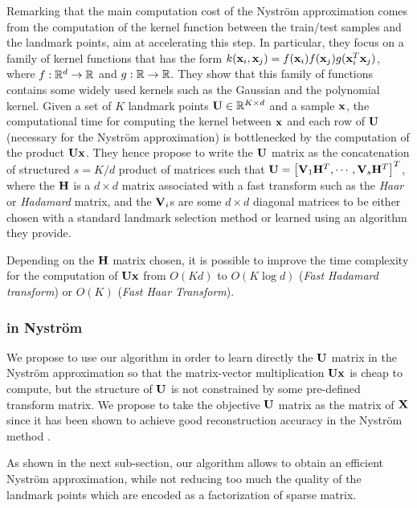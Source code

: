 Remarking that the main computation cost of the Nyström approximation comes from the computation of the kernel function between the train/test samples and the landmark points, \cite{si2016computationally} aim at accelerating this step. In particular, they focus on a family of kernel functions that has the form $k({\mathbf{x}}_i, {\mathbf{x}}_j) = f({\mathbf{x}}_i) f({\mathbf{x}}_j) g({\mathbf{x}}_i^T{\mathbf{x}}_j)$, where $f: \mathbb{R}^d \rightarrow \mathbb{R}$ and $g: \mathbb{R} \rightarrow \mathbb{R}$. They show that this family of functions contains some widely used kernels such as the Gaussian and the polynomial kernel. Given a set of $K$ landmark points ${\mathbf{U}} \in \mathbb{R}^{K \times d}$ and a sample ${\mathbf{x}}$, the computational time for computing the kernel between ${\mathbf{x}}$ and each row of ${\mathbf{U}}$ (necessary for the Nyström approximation) is bottlenecked by the computation of the product ${\mathbf{U}}{\mathbf{x}}$. They hence propose to write the ${\mathbf{U}}$ matrix as the concatenation of structured $s = K / d$ product of matrices such that ${\mathbf{U}} = \left[ {\mathbf{V}}_1 {\mathbf{H}}^T, \cdots, {\mathbf{V}}_s{\mathbf{H}}^T  \right]^T$, where the ${\mathbf{H}}$ is a $d \times d$ matrix associated with a fast transform such as the \textit{Haar} or \textit{Hadamard} matrix, and the ${\mathbf{V}}_i$s are some $d \times d$ diagonal matrices to be either chosen with a standard landmark selection method or learned using an algorithm they provide.

Depending on the ${\mathbf{H}}$ matrix chosen, it is possible to improve the time complexity for the computation of ${\mathbf{U}}{\mathbf{x}}$ from $O(Kd)$ to $O(K \log{d})$ (\textit{Fast Hadamard transform}) or $O(K)$ (\textit{Fast Haar Transform}).

\subsubsection{\qkmeans in Nyström}

We propose to use our \qkmeans algorithm in order to learn directly the ${\mathbf{U}}$ matrix in the Nyström approximation so that the matrix-vector multiplication ${\mathbf{U}} {\mathbf{x}}$ is cheap to compute, but the structure of ${\mathbf{U}}$ is not constrained by some pre-defined transform matrix. We propose to take the objective ${\mathbf{U}}$ matrix as the \kmeans matrix of ${\mathbf{X}}$ since it has been shown to achieve good reconstruction accuracy in the Nyström method \cite{kumar2012sampling}.

As shown in the next sub-section, our algorithm allows to obtain an efficient Nyström approximation, while not reducing too much the quality of the \kmeans landmark points which are encoded as a factorization of sparse matrix. 

